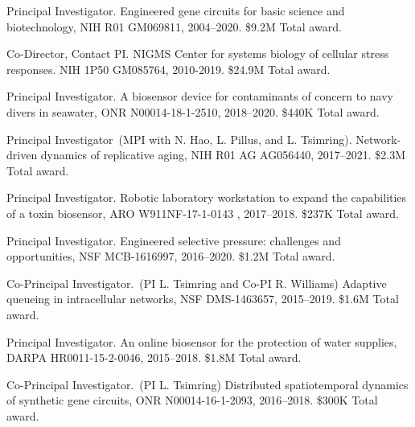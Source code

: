\begin{enumerate}

\begin{item}
Principal Investigator. Engineered gene circuits for basic science and biotechnology, NIH R01 GM069811, 2004--2020.
\$9.2M Total award.
\end{item}

\begin{item}
Co-Director, Contact PI. NIGMS Center for systems biology of cellular stress responses.  NIH 1P50 GM085764, 2010-2019.
\$24.9M Total award.  
\end{item}

\begin{item}
Principal Investigator. A biosensor device for contaminants of concern to navy divers in seawater, ONR N00014-18-1-2510, 2018--2020.
\$440K Total award.
\end{item}

\begin{item}
Principal Investigator~(MPI with N. Hao, L. Pillus, and L. Tsimring). Network-driven dynamics of replicative aging, NIH R01 AG AG056440, 2017--2021.
\$2.3M Total award.
\end{item}

\begin{item}
Principal Investigator. Robotic laboratory workstation to expand the capabilities of a toxin biosensor, ARO W911NF-17-1-0143 , 2017--2018.
\$237K Total award.
\end{item}

\begin{item}
Principal Investigator. Engineered selective pressure: challenges and opportunities, NSF MCB-1616997, 2016--2020.
\$1.2M Total award.
\end{item}

\begin{item}
Co-Principal Investigator.~(PI L. Tsimring  and Co-PI R. Williams) Adaptive queueing in intracellular networks, NSF DMS-1463657, 2015--2019.
\$1.6M Total award.
\end{item}

\begin{item}
Principal Investigator. An online biosensor for the protection of water supplies, DARPA HR0011-15-2-0046, 2015--2018.
\$1.8M Total award.
\end{item}

\begin{item}
Co-Principal Investigator.~(PI L. Tsimring) Distributed spatiotemporal dynamics of synthetic gene circuits, ONR N00014-16-1-2093, 2016--2018.
\$300K Total award.
\end{item}


\end{enumerate}

